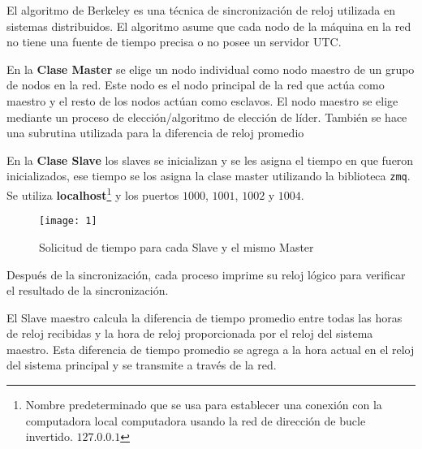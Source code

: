 El algoritmo de Berkeley es una técnica de sincronización de reloj utilizada en
sistemas distribuidos. El algoritmo asume que cada nodo de la máquina en la red
no tiene una fuente de tiempo precisa o no posee un servidor UTC.\@

En la \textbf{Clase Master} se elige un nodo individual como nodo maestro de un
grupo de nodos en la red. Este nodo es el nodo principal de la red que actúa
como maestro y el resto de los nodos actúan como esclavos. El nodo maestro se
elige mediante un proceso de elección/algoritmo de elección de líder.
También se hace una subrutina utilizada para la diferencia de reloj
promedio

En la \textbf{Clase Slave} los slaves se inicializan y se les asigna el tiempo
en que fueron inicializados, ese tiempo se los asigna la clase master utilizando
la biblioteca \texttt{zmq}.
Se utiliza \textbf{localhost}\footnote{Nombre predeterminado que se usa para establecer
  una conexión con la computadora local computadora usando la red de dirección
  de bucle invertido. $127.0.0.1$} y los puertos $1000$, $1001$, $1002$ y $1004$.

\begin{figure}[H]
  \centering
  \texttt{[image: 1]}
  \caption{Solicitud de tiempo para cada Slave y el mismo Master}\label{fig:1}
\end{figure}

Después de la sincronización, cada proceso imprime su reloj lógico para
verificar el resultado de la sincronización.

El Slave maestro calcula la diferencia de tiempo promedio entre todas las horas
de reloj recibidas y la hora de reloj proporcionada por el reloj del sistema
maestro. Esta diferencia de tiempo promedio se agrega a la hora actual en el
reloj del sistema principal y se transmite a través de la red.

